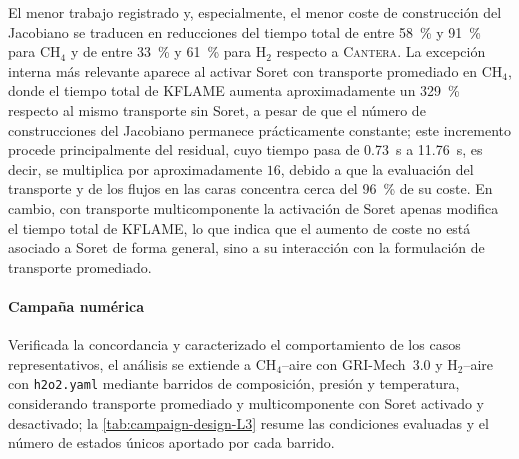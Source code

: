 \documentclass[12pt,a4paper,twoside,openany]{book}
\newcommand{\KFLAME}{\textsc{KFLAME}\xspace}
\newcommand{\Cantera}{\textsc{Cantera}\xspace}
\begin{document}
El menor trabajo registrado y, especialmente, el menor coste de construcción
del Jacobiano se traducen en reducciones del tiempo total de entre
\SI{58}{\percent} y \SI{91}{\percent} para CH$_4$ y de entre
\SI{33}{\percent} y \SI{61}{\percent} para H$_2$ respecto a \Cantera{}. La
excepción interna más relevante aparece al activar Soret con transporte
promediado en CH$_4$, donde el tiempo total de \KFLAME{} aumenta
aproximadamente un \SI{329}{\percent} respecto al mismo transporte sin Soret,
a pesar de que el número de construcciones del Jacobiano permanece
prácticamente constante; este incremento procede principalmente del residual,
cuyo tiempo pasa de \SI{0.73}{\second} a \SI{11.76}{\second}, es decir, se
multiplica por aproximadamente \(16\), debido a que la evaluación del
transporte y de los flujos en las caras concentra cerca del
\SI{96}{\percent} de su coste. En cambio, con transporte multicomponente la
activación de Soret apenas modifica el tiempo total de \KFLAME{}, lo que
indica que el aumento de coste no está asociado a Soret de forma general, sino
a su interacción con la formulación de transporte promediado.

\FloatBarrier

\paragraph{Campaña numérica}

Verificada la concordancia y caracterizado el comportamiento de los casos
representativos, el análisis se extiende a CH$_4$--aire con GRI-Mech~3.0 y
H$_2$--aire con \texttt{h2o2.yaml} mediante barridos de composición, presión y
temperatura, considerando transporte promediado y multicomponente con Soret
activado y desactivado; la \cref{tab:campaign-design-L3} resume las condiciones
evaluadas y el número de estados únicos aportado por cada barrido.
\end{document}
